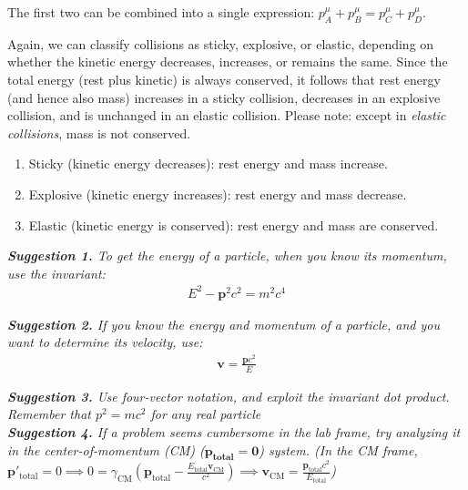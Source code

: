 \documentclass[11pt,letterpaper]{book}
\newcommand{\bm}[1]{\boldsymbol{#1}}
\begin{document}
            The first two can be combined into a single expression: \( p_A^\mu + p_B^\mu = p_C^\mu + p_D^\mu \).
            
            Again, we can classify collisions as sticky, explosive, or elastic, depending on whether the kinetic energy decreases, increases, or remains the same. Since the total energy (rest plus kinetic) is always conserved, it follows that rest energy (and hence also mass) increases in a sticky collision, decreases in an explosive collision, and is unchanged in an elastic collision. Please note: except in \textit{elastic collisions}, mass is not conserved.
            
            \begin{enumerate}
                \item[(a)] Sticky (kinetic energy decreases): rest energy and mass increase.
                \item[(b)] Explosive (kinetic energy increases): rest energy and mass decrease.
                \item[(c)] Elastic (kinetic energy is conserved): rest energy and mass are conserved.
            \end{enumerate}
            
        
        \textit{\textbf{Suggestion 1.} To get the energy of a particle, when you know its momentum, use the invariant:}
        \begin{align}
            E^2-\bm{p}^2c^2=m^2c^4    
        \end{align} 
        
        \textit{\textbf{Suggestion 2.} If you know the energy and momentum of a particle, and you want to determine its velocity, use:}
        \begin{align}
            \bm{v}=\frac{\bm{p}c^2}{E}
        \end{align}
        
        \textit{\textbf{Suggestion 3.} Use four-vector notation, and exploit the invariant dot product. Remember that \(p^2=mc^2\) for any real particle}\\
        
        \textit{\textbf{Suggestion 4.} If a problem seems cumbersome in the lab frame, try analyzing it in the center-of-momentum (CM) (\(\bm{p_{total}=0}\)) system. (In the CM frame, \( \mathbf{p}'_{\text{total}} = 0 \implies 0 = \gamma_{\text{CM}} \left( \mathbf{p}_{\text{total}} - \frac{E_{\text{total}} \mathbf{v}_{\text{CM}}}{c^2} \right) \implies \mathbf{v}_{\text{CM}} = \frac{\mathbf{p}_{\text{total}} c^2}{E_{\text{total}}} \))}
\end{document}

